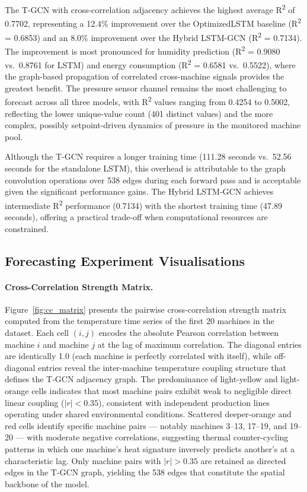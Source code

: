 The T-GCN with cross-correlation adjacency achieves the highest average R\textsuperscript{2} of 0.7702, representing a 12.4\% improvement over the OptimizedLSTM baseline (R\textsuperscript{2} = 0.6853) and an 8.0\% improvement over the Hybrid LSTM-GCN (R\textsuperscript{2} = 0.7134). The improvement is most pronounced for humidity prediction (R\textsuperscript{2} = 0.9080 vs.\ 0.8761 for LSTM) and energy consumption (R\textsuperscript{2} = 0.6581 vs.\ 0.5522), where the graph-based propagation of correlated cross-machine signals provides the greatest benefit. The pressure sensor channel remains the most challenging to forecast across all three models, with R\textsuperscript{2} values ranging from 0.4254 to 0.5002, reflecting the lower unique-value count (401 distinct values) and the more complex, possibly setpoint-driven dynamics of pressure in the monitored machine pool.

Although the T-GCN requires a longer training time (111.28 seconds vs.\ 52.56 seconds for the standalone LSTM), this overhead is attributable to the graph convolution operations over 538 edges during each forward pass and is acceptable given the significant performance gains. The Hybrid LSTM-GCN achieves intermediate R\textsuperscript{2} performance (0.7134) with the shortest training time (47.89 seconds), offering a practical trade-off when computational resources are constrained.

\subsection{Forecasting Experiment Visualisations}

\paragraph{Cross-Correlation Strength Matrix.}
Figure~\ref{fig:cc_matrix} presents the pairwise cross-correlation strength matrix computed from the temperature time series of the first 20 machines in the dataset. Each cell $(i, j)$ encodes the absolute Pearson correlation between machine $i$ and machine $j$ at the lag of maximum correlation. The diagonal entries are identically 1.0 (each machine is perfectly correlated with itself), while off-diagonal entries reveal the inter-machine temperature coupling structure that defines the T-GCN adjacency graph. The predominance of light-yellow and light-orange cells indicates that most machine pairs exhibit weak to negligible direct linear coupling ($|r| < 0.35$), consistent with independent production lines operating under shared environmental conditions. Scattered deeper-orange and red cells identify specific machine pairs --- notably machines 3--13, 17--19, and 19--20 --- with moderate negative correlations, suggesting thermal counter-cycling patterns in which one machine's heat signature inversely predicts another's at a characteristic lag. Only machine pairs with $|r| > 0.35$ are retained as directed edges in the T-GCN graph, yielding the 538 edges that constitute the spatial backbone of the model.

